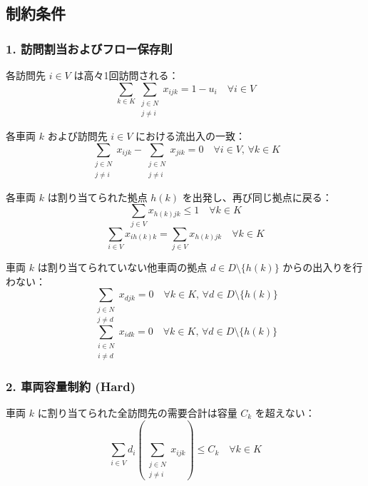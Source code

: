 \documentclass[11pt,a4paper]{article}
\begin{document}
\subsection{制約条件}

\subsubsection{1. 訪問割当およびフロー保存則}
各訪問先 $i \in V$ は高々1回訪問される：
\begin{equation}
\sum_{k \in K} \sum_{\substack{j \in N \\ j \neq i}} x_{ijk} = 1 - u_i \quad \forall i \in V
\end{equation}

各車両 $k$ および訪問先 $i \in V$ における流出入の一致：
\begin{equation}
\sum_{\substack{j \in N \\ j \neq i}} x_{ijk} - \sum_{\substack{j \in N \\ j \neq i}} x_{jik} = 0 \quad \forall i \in V, \, \forall k \in K
\end{equation}

各車両 $k$ は割り当てられた拠点 $h(k)$ を出発し、再び同じ拠点に戻る：
\begin{equation}
\sum_{j \in V} x_{h(k) j k} \le 1 \quad \forall k \in K
\end{equation}
\begin{equation}
\sum_{i \in V} x_{i h(k) k} = \sum_{j \in V} x_{h(k) j k} \quad \forall k \in K
\end{equation}

車両 $k$ は割り当てられていない他車両の拠点 $d \in D \setminus \{h(k)\}$ からの出入りを行わない：
\begin{equation}
\sum_{\substack{j \in N \\ j \neq d}} x_{d j k} = 0 \quad \forall k \in K, \, \forall d \in D \setminus \{h(k)\}
\end{equation}
\begin{equation}
\sum_{\substack{i \in N \\ i \neq d}} x_{i d k} = 0 \quad \forall k \in K, \, \forall d \in D \setminus \{h(k)\}
\end{equation}

\subsubsection{2. 車両容量制約 (Hard)}
車両 $k$ に割り当てられた全訪問先の需要合計は容量 $C_k$ を超えない：
\begin{equation}
\sum_{i \in V} d_i \left( \sum_{\substack{j \in N \\ j \neq i}} x_{ijk} \right) \le C_k \quad \forall k \in K
\end{equation}
\end{document}
